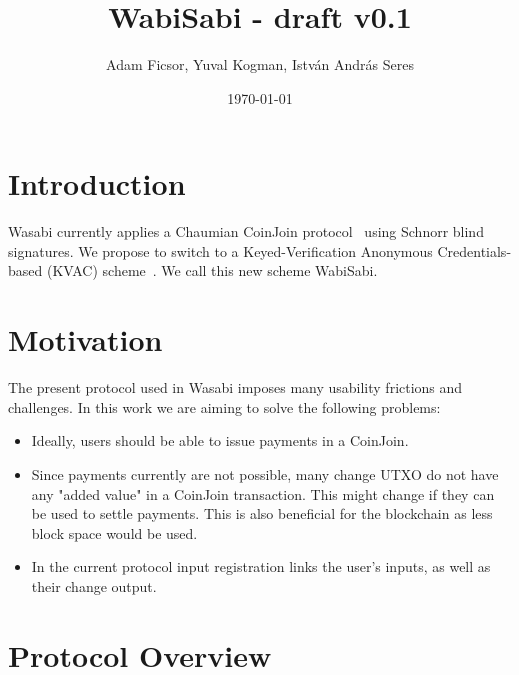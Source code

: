 \documentclass{article}
\title{WabiSabi - draft v0.1}
\author{Adam Ficsor, Yuval Kogman, István András Seres}
\date{\today}
\begin{document}
\maketitle

\section{Introduction}


Wasabi currently applies a Chaumian CoinJoin protocol~\cite{chaum1983blind} using Schnorr blind signatures. We propose to switch to a Keyed-Verification Anonymous Credentials-based (KVAC) scheme~\cite{chase2019signal}. We call this new scheme WabiSabi.

\section{Motivation}
The present protocol used in Wasabi imposes many usability frictions and challenges. In this work we are aiming to solve the following problems:

\begin{itemize}
    \item Ideally, users should be able to issue payments in a CoinJoin. 
    \item Since payments currently are not possible, many change UTXO do not have any "added value" in a CoinJoin transaction. This might change if they can be used to settle payments. This is also beneficial for the blockchain as less block space would be used. 
    \item In the current protocol input registration links the user's inputs, as well as their change output.
\end{itemize}


\section{Protocol Overview}
\end{document}
